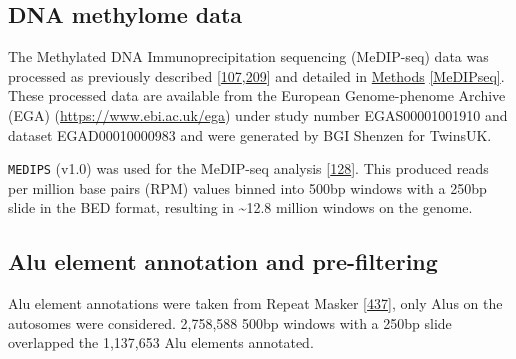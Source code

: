 \documentclass[
]{book}
\begin{document}
\hypertarget{dna-methylome-data}{%
\subsection{DNA methylome data}\label{dna-methylome-data}}

The Methylated DNA Immunoprecipitation sequencing (MeDIP-seq) data was processed as previously described {[}\protect\hyperlink{ref-Bell2017a}{107},\protect\hyperlink{ref-Bell2016}{209}{]} and detailed in \protect\hyperlink{MeDIPseq}{Methods} \ref{MeDIPseq}.
These processed data are available from the European Genome-phenome Archive (EGA) (\url{https://www.ebi.ac.uk/ega}) under study number EGAS00001001910 and dataset EGAD00010000983 and were generated by BGI Shenzen for TwinsUK.

\texttt{MEDIPS} (v1.0) was used for the MeDIP-seq analysis {[}\protect\hyperlink{ref-Lienhard2014}{128}{]}.
This produced reads per million base pairs (RPM) values binned into 500bp windows with a 250bp slide in the BED format, resulting in \textasciitilde12.8 million windows on the genome.

\hypertarget{alu-element-annotation-and-pre-filtering}{%
\subsection{Alu element annotation and pre-filtering}\label{alu-element-annotation-and-pre-filtering}}

Alu element annotations were taken from Repeat Masker {[}\protect\hyperlink{ref-Smit2009}{437}{]}, only Alus on the autosomes were considered.
2,758,588 500bp windows with a 250bp slide overlapped the 1,137,653 Alu elements annotated.
\end{document}
